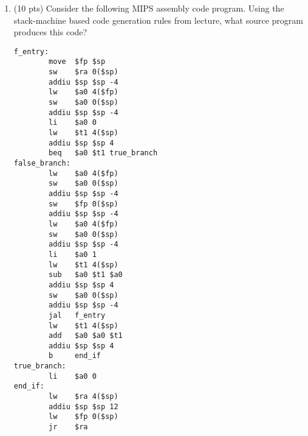 \documentclass[10pt]{article}
\newcommand{\ttmath}[1]{$\mathtt{#1}$}
\newcommand{\ossimple}[6]{#1,#2,#3\vdash #4 : #5,#6}
\newcommand{\deduct}[3]{\frac{#1}{#2}\eqno\mbox{#3}}
\begin{document}
\begin{enumerate}
$$\deduct{
	\begin{array}{l}
		\ossimple{so}{S_1}{E}{e_1}{Bool(false)}{S_2}\\
	\end{array}	
}{
	\ossimple{so}{S_1}{E}{\texttt{while \ttmath{e_1} loop \ttmath{e_2} pool}}{void}{S_2} \\	
}{
	[Loop-False]
}$$
\\
$$\deduct{
	\begin{array}{l}
		\ossimple{so}{S}{E}{e_1}{Bool(true)}{S_1} \\
		\ossimple{so}{S_1}{E}{e_2}{v}{S_2} \\
		\ossimple{so}{S_2}{E}{e_1}{Bool(false)}{S_3} \\

	\end{array}
}{
	\ossimple{so}{S}{E}{\texttt{while \ttmath{e_1} loop \ttmath{e_2} pool}}{v}{S_3} \\		
}{
	[Loop-Last]
}$$
\\
$$ \deduct{
	\begin{array}{l}
		\ossimple{so}{S}{E}{e_1}{Bool(true)}{S_1} \\
		\ossimple{so}{S_1}{E}{e_2}{v_1}{S_2} \\	
		\ossimple{so}{S_2}{E}{e_1}{Bool(true)}{S_4} \\	
		\ossimple{so}{S}{E}{\texttt{while \ttmath{e_1} loop \ttmath{e_2} pool}}{v_2}{S_4} \\		
	\end{array}
}{
	\ossimple{so}{S}{E}{\texttt{while \ttmath{e_1} loop \ttmath{e_2} pool}}{v_2}{S_4} \\			
}{
	[Loop-True]
} $$

\pagebreak

\item (10 pts) Consider the following MIPS assembly code program.  Using the
stack-machine based code generation rules from lecture, what source program produces this
code?
\begin{verbatim}
f_entry:
        move  $fp $sp
        sw    $ra 0($sp)
        addiu $sp $sp -4
        lw    $a0 4($fp)
        sw    $a0 0($sp)
        addiu $sp $sp -4
        li    $a0 0
        lw    $t1 4($sp)
        addiu $sp $sp 4
        beq   $a0 $t1 true_branch
false_branch:
        lw    $a0 4($fp)
        sw    $a0 0($sp)
        addiu $sp $sp -4
        sw    $fp 0($sp)
        addiu $sp $sp -4
        lw    $a0 4($fp)
        sw    $a0 0($sp)
        addiu $sp $sp -4
        li    $a0 1
        lw    $t1 4($sp)
        sub   $a0 $t1 $a0
        addiu $sp $sp 4
        sw    $a0 0($sp)
        addiu $sp $sp -4
        jal   f_entry
        lw    $t1 4($sp)
        add   $a0 $a0 $t1
        addiu $sp $sp 4
        b     end_if
true_branch:
        li    $a0 0
end_if:
        lw    $ra 4($sp)
        addiu $sp $sp 12
        lw    $fp 0($sp)
        jr    $ra
\end{verbatim}


\end{enumerate}
\end{document}
